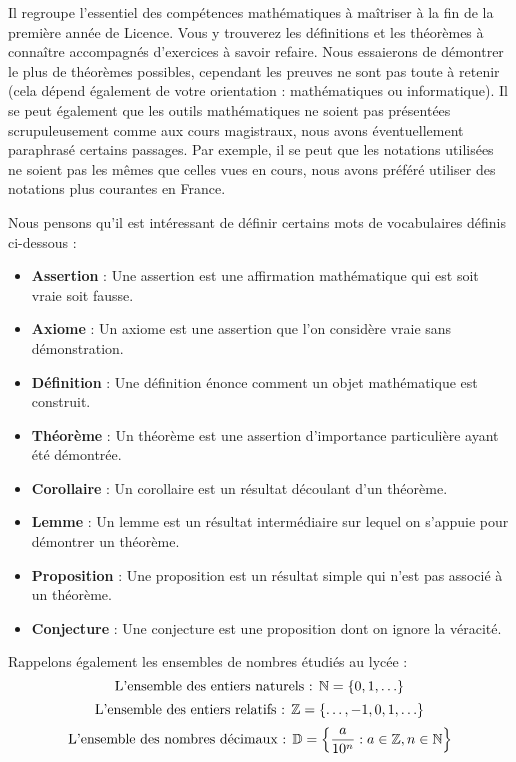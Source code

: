 \par \noindent Il regroupe l'essentiel des compétences mathématiques à maîtriser à la fin de la première année de Licence. Vous y trouverez les définitions et les théorèmes à connaître accompagnés d'exercices à savoir refaire. Nous essaierons de démontrer le plus de théorèmes possibles, cependant les preuves ne sont pas toute à retenir (cela dépend également de votre orientation : mathématiques ou informatique).
Il se peut également que les outils mathématiques ne soient pas présentées scrupuleusement comme aux cours magistraux, nous avons éventuellement paraphrasé certains passages. Par exemple, il se peut que les notations utilisées ne soient pas les mêmes que celles vues en cours, nous avons préféré utiliser des notations plus courantes en France.
\\
\par \noindent Nous pensons qu'il est intéressant de définir certains mots de vocabulaires définis ci-dessous :
\begin{itemize}
    \item \textbf{Assertion} : Une assertion est une affirmation mathématique qui est soit vraie soit fausse. 
    \item \textbf{Axiome} : Un axiome est une assertion que l'on considère vraie sans démonstration.
    \item \textbf{Définition} : Une définition énonce comment un objet mathématique est construit.
    \item \textbf{Théorème} : Un théorème est une assertion d'importance particulière ayant été démontrée.
    \item \textbf{Corollaire} : Un corollaire est un résultat découlant d'un théorème.
    \item \textbf{Lemme} : Un lemme est un résultat intermédiaire sur lequel on s'appuie pour démontrer un théorème.
    \item \textbf{Proposition} : Une proposition est un résultat simple qui n'est pas associé à un théorème.
    \item \textbf{Conjecture} : Une conjecture est une proposition dont on ignore la véracité.
\end{itemize}
\par \noindent Rappelons également les ensembles de nombres étudiés au lycée :
\[ \text{L'ensemble des entiers naturels : } \mathbb{N} = \{0, 1, \ldots \} \]
\[ \text{L'ensemble des entiers relatifs : } \mathbb{Z} = \{ \ldots, -1, 0, 1, \ldots \} \]
\[ \text{L'ensemble des nombres décimaux : } \mathbb{D} = \left\{ \frac{a}{10^n} : a \in \mathbb{Z}, n \in \mathbb{N} \right\} \]
